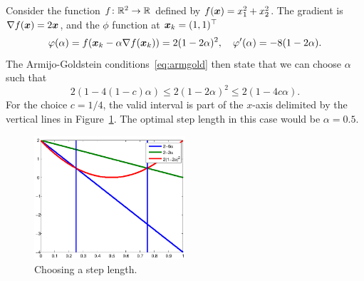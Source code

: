 \begin{example}
 Consider the function $f\colon \mathbb{R}^2\to \mathbb{R}$ defined by $f(\bm{x}) = x_1^2+x_2^2$. The gradient is $\nabla f(\bm{x}) = 2\bm{x}$, and the $\phi$ function at $\bm{x}_k=(1,1)^{\top}$
 \begin{equation*}
  \varphi(\alpha) = f(\bm{x}_k-\alpha \nabla f(\bm{x}_k)) = 2(1-2\alpha)^2, \quad \varphi'(\alpha) = -8(1-2\alpha).
 \end{equation*}
The Armijo-Goldstein conditions~\eqref{eq:armgold} then state that we can choose $\alpha$ such that
\begin{equation*}
 2(1-4(1-c)\alpha) \leq 2(1-2\alpha)^2 \leq 2(1-4c\alpha).
\end{equation*}
For the choice $c=1/4$, the valid interval is part of the $x$-axis delimited by the vertical lines in Figure~\ref{fig:armgold}. The optimal step length in this case would be $\alpha=0.5$.

\begin{figure}[h!]\label{fig:armgold}
\centering
 \includegraphics[width=0.5\textwidth]{images/goldarmijo_cropped.pdf}
 \caption{Choosing a step length.}
\end{figure}

\end{example}

